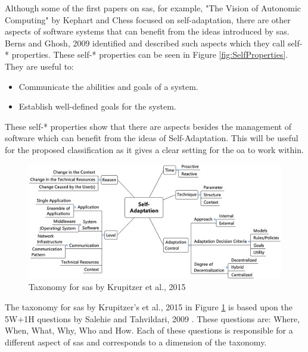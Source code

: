\newpage
\noindent Although some of the first papers on \acrshort{sas}, for example, 
"The Vision of Autonomic Computing" by Kephart and Chess \cite*{VisionOfAutonomicComputing} focused on self-adaptation,
there are other aspects of software systems that can benefit from the ideas introduced by \acrshort{sas}.
Berns and Ghosh, 2009 \cite*{DissectingSelfProperties} identified and described such aspects which they call self-* properties.
These self-* properties can be seen in Figure \ref{fig:SelfProperties}.
They are useful to:
\begin{itemize}[nosep]
    \item Communicate the abilities and goals of a system.
    \item Establish well-defined goals for the system.
\end{itemize}

\noindent These self-* properties show that there are aspects besides the management of software which can benefit from the ideas of Self-Adaptation.
This will be useful for the proposed classification as it gives a clear setting for the \acrshort{oa} to work within.

\begin{figure}[t!]
    \includegraphics[width=\textwidth]{images/KrupitzerTaxonomy.jpg}
    \caption{Taxonomy for \acrshort{sas} by Krupitzer et al., 2015 \cite*{SurveyOnEngineeringApproaches}}
    \label{fig:KrupitzerTaxonomy}
\end{figure}

\noindent The taxonomy for \acrshort{sas} by Krupitzer's et al., 2015 \cite*{SurveyOnEngineeringApproaches} in Figure \ref{fig:KrupitzerTaxonomy}
is based upon the 5W+1H questions by Salehie and Tahvildari, 2009 \cite*{LandscapeAndResearchChallenges}.
These questions are: Where, When, What, Why, Who and How.
Each of these questions is responsible for a different aspect of \acrshort{sas} and corresponds to a dimension of the taxonomy.

